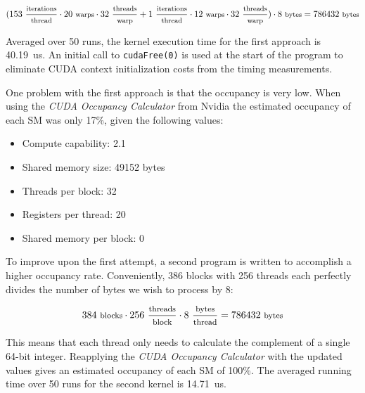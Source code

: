\begin{enumerate}
\begin{displaymath}
(153~\frac{\text{\footnotesize iterations}}{\text{\footnotesize thread}} \cdot 20~\text{\footnotesize warps} \cdot 32~\frac{\text{\footnotesize threads}}{\text{\footnotesize warp}} + 1~\frac{\text{\footnotesize iterations}}{\text{\footnotesize thread}} \cdot 12~\text{\footnotesize warps} \cdot 32~\frac{\text{\footnotesize threads}}{\text{\footnotesize warp}}) \cdot 8~\text{\footnotesize bytes} = 786432~\text{\footnotesize bytes}
\end{displaymath}

Averaged over 50 runs, the kernel execution time for the first approach is 40.19~us. An initial call to \texttt{cudaFree(0)} is used at the start of the program to eliminate \ac{CUDA} context initialization costs from the timing measurements.

One problem with the first approach is that the occupancy is very low. When using the \textit{CUDA Occupancy Calculator} from Nvidia the estimated occupancy of each \ac{SM} was only 17\%, given the following values:

\begin{itemize}
\item Compute capability: 2.1
\item Shared memory size: 49152 bytes
\item Threads per block: 32
\item Registers per thread: 20
\item Shared memory per block: 0
\end{itemize}

To improve upon the first attempt, a second program is written to accomplish a higher occupancy rate. Conveniently, 386 blocks with 256 threads each perfectly divides the number of bytes we wish to process by 8:

\begin{displaymath}
384~\text{\footnotesize blocks} \cdot 256~\frac{\text{\footnotesize threads}}{\text{\footnotesize block}} \cdot 8~\frac{\text{\footnotesize bytes}}{\text{\footnotesize thread}} = 786432~\text{\footnotesize bytes}
\end{displaymath}

This means that each thread only needs to calculate the complement of a single 64-bit integer. Reapplying the \textit{CUDA Occupancy Calculator} with the updated values gives an estimated occupancy of each \ac{SM} of 100\%. The averaged running time over 50 runs for the second kernel is 14.71~us.


\end{enumerate}
